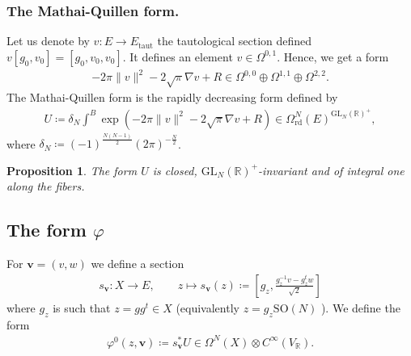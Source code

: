 \documentclass[a4paper,11pt]{amsart} %
\newcommand{\8}{\infty}
\newcommand{\vbf}{\mathbf{v}}
\newcommand{\SO}{\mathrm{SO}}
\newcommand{\GL}{\mathrm{GL}}
\newcommand{\R}{\mathbb{R}}
\newcommand{\rd}{\textrm{rd}}
\newcommand{\taut}{\textrm{taut}}
\theoremstyle{mytheoremstyle}
\newtheorem{prop}[thm]{Proposition}
\theoremstyle{remark}
\numberwithin{equation}{section}
\begin{document}
\subsubsection{The Mathai-Quillen form.} \label{subsubsec : mqform} Let us denote by $v \colon E \longrightarrow E_{\taut}$ the tautological section defined $v[g_0,v_0]=[g_0,v_0,v_0]$. It defines an element $v \in \Omega^{0,1}$. Hence, we get a form
\begin{align}
-2\pi \lVert v \rVert^2-2\sqrt{\pi}\nabla v +R \in \Omega^{0,0} \oplus \Omega^{1,1} \oplus \Omega^{2,2}.    
\end{align}
The Mathai-Quillen form is the rapidly decreasing form defined by
\begin{align}
    U \coloneqq\delta_N\int^B \exp \left (-2\pi \lVert v \rVert^2-2\sqrt{\pi}\nabla v +R  \right ) \in \Omega^{N}_\rd(E)^{\GL_N(\R)^+},
\end{align}
where $\delta_N \coloneqq (-1)^{\frac{N(N-1)}{2}}(2\pi)^{-\frac{N}{2}}$.
\begin{prop}\cite[Theorem.~4.10]{mq} \label{Uprop} The form $U$ is closed, $\GL_N(\R)^+$-invariant and of integral one along the fibers.
\end{prop}


\subsection{The form $\varphi$} \label{sec:varphiform}
For $\vbf=(v,w)$ we define a section
\begin{align}
 s_\vbf \colon X  \longrightarrow E, \qquad z \longmapsto  s_\vbf(z) \coloneqq \left [g_z, \frac{g_z^{-1}v-g_z^tw}{\sqrt{2}} \right ]
\end{align}
where $g_z$ is such that $z=gg^t \in X$ (equivalently $z=g_z\SO(N)$ ). We define the form
\begin{align}
    \varphi^0(z,\vbf) \coloneqq s_\vbf^\ast U \in \Omega^N(X)\otimes C^\8(V_\R).
\end{align}
\end{document}
